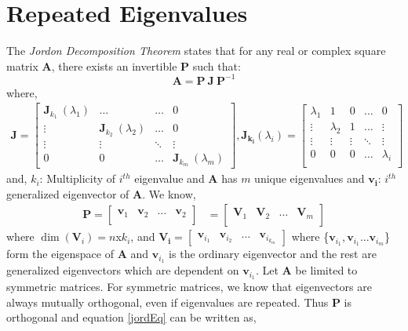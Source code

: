 \section{Repeated Eigenvalues}
The \emph{Jordon Decomposition Theorem} states that for any real or complex square matrix $\mathbf{A}$, there exists an invertible $\mathbf{P}$ such that:
\begin{equation}
    \bm{A} = \bm{P}\: \bm{J}\: \bm{P}^{-1}
    \label{jordEq}
\end{equation}
where,
\begin{align*}
\bm{J}=
\begin{bmatrix}
\bm{J}_{k_1}\:(\lambda_1) & \dots & \dots & 0 \\
\vdots & \bm{J}_{k_2}\:(\lambda_2) & \dots & 0 \\
\vdots & \vdots & \ddots & \vdots \\
0 & 0 & \dots & \bm{J}_{k_m}\:(\lambda_m) 
\end{bmatrix},
 \bm{J_{k_i}}(\lambda_i) =
\begin{bmatrix}
    \lambda_1 & 1 & 0 & \dots & 0 \\
    \vdots & \lambda_2 & 1 & \dots & \vdots \\
    \vdots & \vdots & \vdots & \ddots & \vdots \\
    0 & 0 & 0 & \dots & \lambda_i \\
\end{bmatrix}
\end{align*}
and, $k_i$: Multiplicity of $i^{th}$ eigenvalue and $\mathbf{A}$ has $m$ unique eigenvalues and $\bm{v_i}$: $i^{th}$ generalized eigenvector of $\mathbf{A}$. We know,
\begin{align*}
\bm{P} =
\begin{bmatrix}
\bm{v}_1 & \bm{v}_2 & \dots & \bm{v}_2 \\ 
\end{bmatrix} 
&= 
\begin{bmatrix}
\bm{V}_1 & \bm{V}_2 & \dots & \bm{V}_m \\ 
\end{bmatrix}
\end{align*}
where $\dim(\bm{V}_i) = n $x$ k_i$, and
$\bm{V_i} = 
\begin{bmatrix}
\bm{v}_{i_1} & \bm{v}_{i_2} & \dots & \bm{v}_{i_{k_m}} 
\end{bmatrix}$
where \{$\bm{v}_{i_1},\bm{v}_{i_1} ... \bm{v}_{i_m}$\} form the eigenspace of $\mathbf{A}$ and $\bm{v}_{i_1}$ is the ordinary eigenvector and the rest are generalized eigenvectors which are dependent on $\bm{v}_{i_1}$. Let $\mathbf{A}$ be limited to symmetric matrices. For symmetric matrices, we know that eigenvectors are always mutually orthogonal, even if eigenvalues are repeated. Thus $\mathbf{P}$ is orthogonal and equation \ref{jordEq} can be written as,
